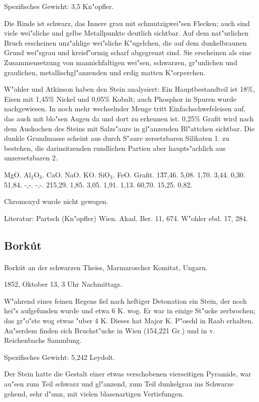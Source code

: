 \documentclass[a4paper, 11pt, oneside]{article}
\begin{document}
Spezifisches Gewicht: 3,5 Kn"opfler.

Die Rinde ist schwarz, das Innere grau mit schmutzigwei"sen Flecken; auch sind viele wei"sliche und gelbe Metallpunkte deutlich sichtbar. Auf dem nat"urlichen Bruch erscheinen unz"ahlige wei"sliche K"ugelchen, die auf dem dunkelbraunen Grund wei"sgrau und kreisf"ormig scharf abgegrenzt sind. Sie erscheinen als eine Zusammensetzung von mannichfaltigen wei"sen, schwarzen, gr"unlichen und graulichen, metallischgl"anzenden und erdig matten K"orperchen.

W"ohler und Atkinson haben den Stein analysiert: Ein Hauptbestandteil ist 18\%, Eisen mit 1,45\% Nickel und 0,05\% Kobalt; auch Phosphor in Spuren wurde nachgewiesen. In noch mehr wechselnder Menge tritt Einfachschwefeleisen auf, das auch mit blo"sen Augen da und dort zu erkennen ist. 0,25\% Grafit wird nach dem Auskochen des Steins mit Salzs"aure in gl"anzenden Bl"attchen sichtbar. Die dunkle Grundmasse scheint aus durch S"aure zersetzbaren Silikaten 1. zu bestehen, die darinsitzenden rundlichen Partien aber haupts"achlich aus unzersetzbaren 2.

MgO. Al$_{2}$O$_{3}$. CaO. NaO. KO. SiO$_{3}$. FeO. Grafit.  
1\. 37,46. 5,08. 1,70. 3,44. 0,30. 51,84. -,-. -,-.  
2\. 15,29. 1,85. 3,05. 1,91. 1,13. 60,70. 15,25. 0,82.

Chromoxyd wurde nicht gewogen.

\footnotesize
Literatur: Partsch (Kn"opfler) Wien. Akad. Ber. 11, 674. W"ohler ebd. 17, 284.

\subsection{Borkút}
\normalsize
\paragraph{}
Borkút an der schwarzen Theiss, Marmaroscher Komitat, Ungarn.

1852, Oktober 13, 3 Uhr Nachmittags.

W"ahrend eines feinen Regens fiel nach heftiger Detonation ein Stein, der noch hei"s aufgefunden wurde und etwa 6 K. wog. Er war in einige St"ucke zerbrochen; das gr"o"ste wog etwas "uber 4 K. Dieses hat Major K. P"oschl in Raab erhalten. Au"serdem finden sich Bruchst"ucke in Wien (154,221 Gr.) und in v. Reichenbachs Sammlung.

Spezifisches Gewicht: 5,242 Leydolt.

Der Stein hatte die Gestalt einer etwas verschobenen vierseitigen Pyramide, war au"sen zum Teil schwarz und gl"anzend, zum Teil dunkelgrau ins Schwarze gehend, sehr d"unn, mit vielen blasenartigen Vertiefungen.
\end{document}
